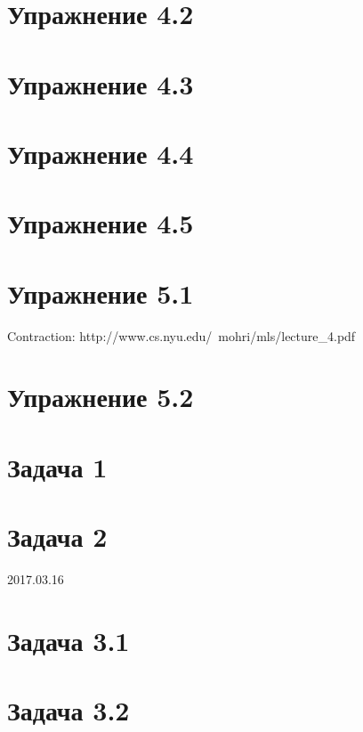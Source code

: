 \documentclass[a4paper]{article}
\begin{document}
\section*{Упражнение 4.2}
\section*{Упражнение 4.3}
\section*{Упражнение 4.4}
\section*{Упражнение 4.5}
\section*{Упражнение 5.1}
Contraction: http://www.cs.nyu.edu/~mohri/mls/lecture_4.pdf
\section*{Упражнение 5.2}
\section*{Задача 1}
\section*{Задача 2}
2017.03.16
\section*{Задача 3.1}

\section*{Задача 3.2}
\end{document}
